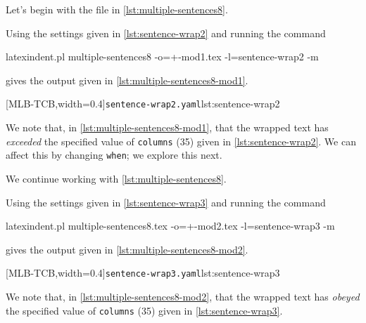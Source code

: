  \begin{example}
 Let's begin with the file in \cref{lst:multiple-sentences8}.


 Using the settings given in \cref{lst:sentence-wrap2} and running the command

 \begin{commandshell}
latexindent.pl multiple-sentences8 -o=+-mod1.tex -l=sentence-wrap2 -m
   \end{commandshell}

 gives the output given in \cref{lst:multiple-sentences8-mod1}.

 \begin{cmhtcbraster}[raster columns=2,
   raster left skip=-1.5cm,
   raster right skip=-0cm,
   raster column skip=.06\linewidth]
  [MLB-TCB,width=0.4\linewidth]{\texttt{sentence-wrap2.yaml}}{lst:sentence-wrap2}
 \end{cmhtcbraster}

 We note that, in \cref{lst:multiple-sentences8-mod1}, that the wrapped text has
 \emph{exceeded} the specified value of \texttt{columns} (35) given in
 \cref{lst:sentence-wrap2}. We can affect this by changing \texttt{when}; we explore this
 next.
 \end{example}

 \begin{example}
 We continue working with \cref{lst:multiple-sentences8}.

 Using the settings given in \cref{lst:sentence-wrap3} and running the command

 \begin{commandshell}
latexindent.pl multiple-sentences8.tex -o=+-mod2.tex -l=sentence-wrap3 -m
   \end{commandshell}

 gives the output given in \cref{lst:multiple-sentences8-mod2}.

 \begin{cmhtcbraster}[raster columns=2,
   raster left skip=-1.5cm,
   raster right skip=-0cm,
   raster column skip=.06\linewidth]
  [MLB-TCB,width=0.4\linewidth]{\texttt{sentence-wrap3.yaml}}{lst:sentence-wrap3}
 \end{cmhtcbraster}

 We note that, in \cref{lst:multiple-sentences8-mod2}, that the wrapped text has
 \emph{obeyed} the specified value of \texttt{columns} (35) given in
 \cref{lst:sentence-wrap3}.
 \end{example}

